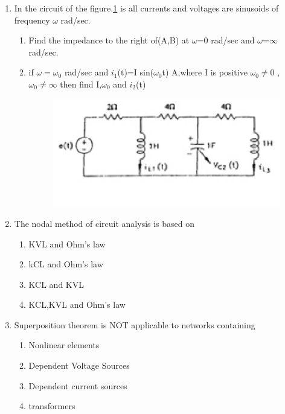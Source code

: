 \documentclass[journal,12pt,twocolumn]{IEEEtran}
\begin{document}
\begin{enumerate}
\item In the circuit of the figure.\ref{fig20} is all currents and voltages are sinusoids of frequency $\omega$ rad/sec.
\begin{enumerate}
\setlength\itemsep{2em}
\item Find the impedance to the right of(A,B) at $\omega$=0 rad/sec and $\omega$=$\infty$ rad/sec.
\item if $\omega=\omega_{0}$ rad/sec and $i_{1}$(t)=I sin($\omega_{0}$t) A,where I is positive $\omega_{0}\neq$0 ,$\omega_{0}\neq\infty$ then find I,$\omega_{0}$ and $i_{2}$(t)
\begin{figure}[!h]
\begin{center}
\includegraphics[scale=0.5]{./figs/fig20.eps}
\caption{}
\label{fig20}
\end{center}
\end{figure}
\end{enumerate}


\item The nodal method of circuit analysis is based on
\begin{enumerate}
\setlength\itemsep{2em}
\item KVL and Ohm's law
\item kCL and Ohm's law
\item KCL and KVL
\item KCL,KVL and Ohm's law
\end{enumerate}


\item Superposition theorem is NOT applicable to networks containing
\begin{enumerate}
\setlength\itemsep{2em}
\item Nonlinear elements
\item Dependent Voltage Sources
\item Dependent current sources
\item transformers
\end{enumerate}


\end{enumerate}
\end{document}
